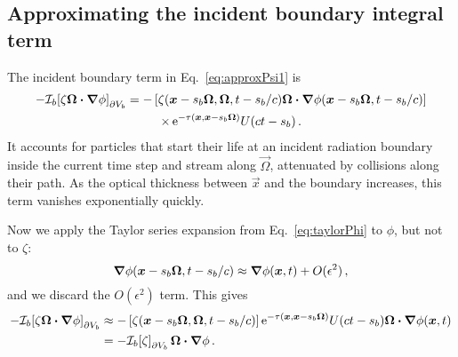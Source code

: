 \subsection{Approximating the incident boundary integral term}
\label{sec:adIncident}
The incident boundary term in Eq.~\eqref{eq:approxPsi1} is
\begin{multline*}
-\mathcal{I}_{b}\!\left[\zeta \bm{\Omega}\bm{\cdot} \bm{\nabla} \phi\right]_{\partial V_b}
  = -\left[\zeta(\bm{x} - s_b\bm{\Omega}, \bm{\Omega}, t - s_b/c)
   \bm{\Omega}\bm{\cdot} \bm{\nabla} \phi(\bm{x} - s_b\bm{\Omega}, t - s_b/c) \right]
   \\
\times
    \mathop{}\!\mathrm{e}^{ -\tau(\bm{x}, \bm{x} - s_b \bm{\Omega})}
    U(ct - s_b) \,.
\end{multline*}
It accounts for particles that start their life at an incident radiation
boundary
inside the current time step and stream along $\vec{\Omega}$, attenuated by
collisions along their path. As the optical thickness between
$\vec{x}$ and the boundary increases, this term vanishes
exponentially quickly.

Now we apply the Taylor series expansion from Eq.~\eqref{eq:taylorPhi} to
$\phi$, but not to $\zeta$:
\begin{equation*}
  \bm{\nabla} \phi(\bm{x} - s_b\bm{\Omega}, t - s_b/c)
  \approx \bm{\nabla} \phi(\bm{x}, t) + O(\epsilon^2)\,,
\end{equation*}
and we discard the $O(\epsilon^2)$ term. This gives
\begin{align} \nonumber
-\mathcal{I}_{b}\!\left[\zeta \bm{\Omega}\bm{\cdot} \bm{\nabla} \phi\right]_{\partial V_b}
&\approx -\left[\zeta(\bm{x} - s_b\bm{\Omega}, \bm{\Omega}, t - s_b/c) \right]
  \mathop{}\!\mathrm{e}^{ -\tau(\bm{x}, \bm{x} - s_b \bm{\Omega})} U(ct - s_b)
  \bm{\Omega}\bm{\cdot} \bm{\nabla} \phi(\bm{x}, t)
 \\ \label{eq:bndyApprox}
&= -\mathcal{I}_{b}\!\left[\zeta\right]_{\partial V_b} \bm{\Omega}\bm{\cdot} \bm{\nabla} \phi \,.
\end{align}

